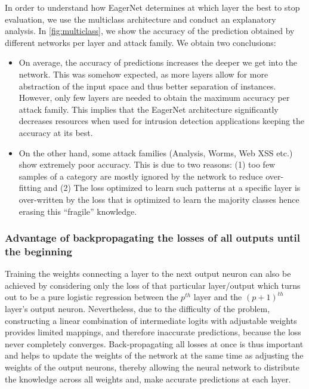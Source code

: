 \documentclass[conference]{IEEEtran}
\newcommand{\mynote}[3]{
    \fbox{\bfseries\sffamily\scriptsize#1}
    {\small$\blacktriangleright$\textsf{\emph{\color{#3}{#2}}}$\blacktriangleleft$}}
\newcommand{\todo}[1]{\mynote{TODO}{#1}{red}}
\begin{document}
In order to understand how EagerNet determines at which layer the best to stop evaluation, we use the multiclass architecture and conduct an explanatory analysis. In \autoref{fig:multiclass}, we show the accuracy of the prediction obtained by different networks per layer and attack family. We obtain two conclusions:
\begin{itemize}
\item  On average, the accuracy of predictions increases the deeper we get into the network. This was somehow expected, as more layers allow for more abstraction of the input space and thus better separation of instances. However, only few layers are needed to obtain the maximum accuracy per attack family. This implies that the EagerNet architecture significantly decreases resources when used for intrusion detection applications keeping the accuracy at its best.
\item  On the other hand, some attack families (Analysis, Worms, Web XSS etc.) show extremely poor accuracy. This is due to two reasons: (1) too few samples of a category are mostly ignored by the network to reduce over-fitting and (2) The loss optimized to learn such patterns at a specific layer is over-written by the loss that is optimized to learn the majority classes hence erasing this ``fragile'' knowledge.
\end{itemize}





\subsubsection{Advantage of backpropagating the losses of all outputs until the beginning}

Training the weights connecting a layer to the next output neuron can also be achieved by considering only the loss of that particular layer/output which turns out to be a pure logistic regression between the $p^{th}$ layer and the $(p+1)^{th}$ layer's output neuron. Nevertheless, due to the difficulty of the problem, constructing a linear combination of intermediate logits with adjustable weights provides limited mappings, and therefore inaccurate predictions, because the loss never completely converges. Back-propagating all losses at once is thus important and helps to update the weights of the network at the same time as adjusting the weights of the output neurons, thereby allowing the neural network to distribute the knowledge across all weights and, make accurate predictions at each layer.
\end{document}
